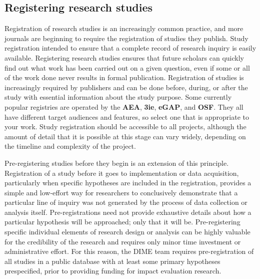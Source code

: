 \subsection{Registering research studies}

Registration of research studies is an increasingly common practice,
and more journals are beginning to require
the registration of studies they publish.
Study registration intended to ensure that a complete record of research inquiry is easily available.
Registering research studies ensures that future scholars can quickly
find out what work has been carried out on a given question,
even if some or all of the work done never results in formal publication.
Registration of studies is increasingly required by publishers
and can be done before, during, or after the study
with essential information about the study purpose.
Some currently popular registries are operated by the
\textbf{AEA},
\textbf{3ie},
\textbf{eGAP},
and \textbf{OSF}.
They all have different target audiences and features,
so select one that is appropriate to your work.
Study registration should be accessible to all projects,
although the amount of detail that it is possible at this stage can vary widely,
depending on the timeline and complexity of the project.

Pre-registering studies before they begin is an extension of this principle.
Registration of a study before it goes to implementation or data acquisition,
particularly when specific hypotheses are included in the registration,
provides a simple and low-effort way for researchers
to conclusively demonstrate that a particular line of inquiry
was not generated by the process of data collection or analysis itself.
Pre-registrations need not provide exhaustive details about how
a particular hypothesis will be approached; only that it will be.
Pre-registering specific individual elements of research design or analysis 
can be highly valuable for the credibility of the research
and requires only minor time investment or administrative effort.
For this reason, the DIME team requires pre-registration of all studies
in a public database with at least some primary hypotheses prespecified,
prior to providing funding for impact evaluation research.

